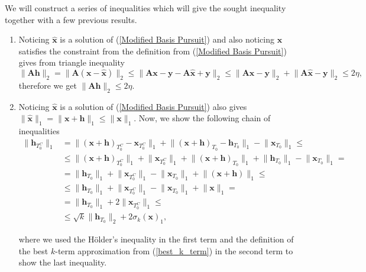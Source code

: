 \documentclass[11pt,oneside,czech,american]{book} %
\theoremstyle{definition} %
\theoremstyle{definition}
\begin{document}
We will construct a series of inequalities which will give the sought inequality together with a few previous results.

\begin{enumerate}
	\item Noticing $\bm{\hat{x}}$ is a solution of (\ref{Modified Basis Pursuit}) and also noticing $\bm{x}$ satisfies the constraint from the definition from (\ref{Modified Basis Pursuit}) gives from triangle inequality
	\begin{equation}
		\lVert \bm{A}\bm{h} \rVert_2 = \lVert \bm{A} (\bm{x}-\bm{\hat{x}}) \rVert_2 \leq \lVert \bm{A}\bm{x} - \bm{y} - \bm{A}\bm{\hat{x}} + \bm{y} \rVert_2 \leq \lVert \bm{A}\bm{x} - \bm{y} \rVert_2 + \lVert \bm{A}\bm{\hat{x}} - \bm{y} \rVert_2 \leq 2 \eta,
		\label{short_shit}
	\end{equation}
	therefore we get $\lVert \bm{A}\bm{h} \rVert_2 \leq 2 \eta$.
	\item Noticing $\bm{\hat{x}}$ is a solution of (\ref{Modified Basis Pursuit}) also gives $\lVert \bm{\hat{x}} \rVert_1 = \lVert \bm{x} + \bm{h} \rVert_1 \leq \lVert \bm{x} \rVert_1$. Now, we show the following chain of inequalities
	\begin{equation}
		\begin{aligned}
		\lVert \bm{h}_{T^C_0} \rVert_1 &= \lVert (\bm{x}+\bm{h})_{T^C_0} - \bm{x}_{T^C_0} \rVert_1 + \lVert (\bm{x}+\bm{h})_{T_0} - \bm{h}_{T_0} \rVert_1 - \lVert \bm{x}_{T_0} \rVert_1 \leq \\
		&\leq \lVert (\bm{x}+\bm{h})_{T^C_0} \rVert_1 + \lVert \bm{x}_{T^C_0} \rVert_1 + \lVert (\bm{x}+\bm{h})_{T_0} \rVert_1 + \lVert \bm{h}_{T_0} \rVert_1 - \lVert \bm{x}_{T_0} \rVert_1 = \\
		&= \lVert \bm{h}_{T_0} \rVert_1 + \lVert \bm{x}_{T^C_0} \rVert_1 - \lVert \bm{x}_{T_0} \rVert_1  + \lVert(\bm{x}+\bm{h})\rVert_1 \leq \\
		&\leq \lVert \bm{h}_{T_0} \rVert_1 + \lVert \bm{x}_{T^C_0} \rVert_1 - \lVert \bm{x}_{T_0} \rVert_1  + \lVert \bm{x} \rVert_1 = \\
		&= \lVert \bm{h}_{T_0} \rVert_1 + 2 \lVert \bm{x}_{T^C_0} \rVert_1 \leq \\
		&\leq \sqrt{k} \lVert \bm{h}_{T_0} \rVert_2 + 2\sigma_k(\bm{x})_1,
		\end{aligned}
	\label{long_shit}
	\end{equation}

where we used the Hölder's inequality in the first term and the definition of the best $k$-term approximation from (\ref{best_k_term}) in the second term to show the last inequality.


\end{enumerate}
\end{document}
